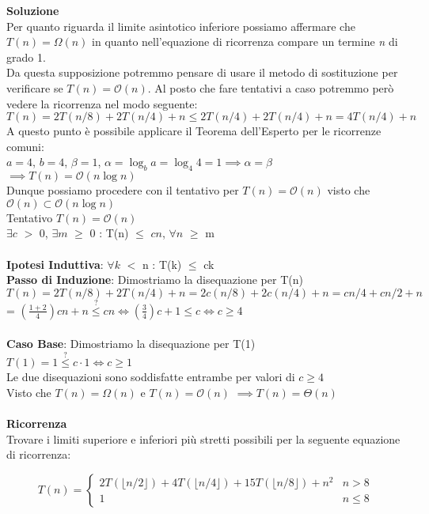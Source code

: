 \documentclass[../cheatSheetAlgoritmi.tex]{subfiles}
\begin{document}
\textbf{Soluzione}\\
Per quanto riguarda il limite asintotico inferiore possiamo affermare che $T(n) = \Omega(n)$ in quanto nell'equazione di ricorrenza compare un termine \textit{n} di grado 1.\\
Da questa supposizione potremmo pensare di usare il metodo di sostituzione per verificare se $T(n) = \mathcal{O}(n)$. Al posto che fare tentativi a caso potremmo però vedere la ricorrenza nel modo seguente:\\
$T(n) = 2T(n/8) + 2T(n/4) + n \leq 2T(n/4) + 2T(n/4) + n = 4T(n/4) + n$\\
A questo punto è possibile applicare il Teorema dell'Esperto per le ricorrenze comuni:\\
$a = 4$, $b = 4$, $\beta = 1$, $\alpha = \log_{b}{a} = \log_{4}{4} = 1 \implies \alpha = \beta$\\
$\implies T(n) = \mathcal{O}(n\log{n})$\\
Dunque possiamo procedere con il tentativo per $T(n) = \mathcal{O}(n)$ visto che $\mathcal{O}(n) \subset \mathcal{O}(n\log{n})$\\
Tentativo $T(n) = \mathcal{O}(n)$\\
$\exists c$ $>$ 0, $\exists m$ $\geq$ 0 : T(n) $\leq$ $cn$, $\forall n$ $\geq$ m\\\\
\textbf{Ipotesi Induttiva}: $\forall k$ $<$ n : T(k) $\leq$ ck\\
\textbf{Passo di Induzione}: Dimostriamo la disequazione per T(n)\\
$T(n) = 2T(n/8) + 2T(n/4) + n = 2c(n/8) + 2c(n/4) + n = cn/4 + cn/2 + n$\\
= $(\frac{1 + 2}{4})cn + n \stackrel{?}{\leq} cn \iff (\frac{3}{4})c + 1 \leq c \iff c \geq 4$\\\\
\textbf{Caso Base}: Dimostriamo la disequazione per T(1)\\
$T(1) = 1 \stackrel{?}{\leq} c \cdot 1 \iff c \geq 1$\\
Le due disequazioni sono soddisfatte entrambe per valori di $c \geq 4$\\
Visto che $T(n) = \Omega(n)$ e $T(n) = \mathcal{O}(n)$ $\implies T(n) = \Theta(n)$\\\\
\textbf{Ricorrenza}\\
Trovare i limiti superiore e inferiori più stretti possibili per la seguente equazione di ricorrenza:
\begin{center}
	\begin{equation*}
  		T(n)=\begin{cases}
			2T(\lfloor n/2 \rfloor) + 4T(\lfloor n/4 \rfloor) + 15T(\lfloor n/8 \rfloor) + n^{2} & \text{$n > 8$}\\
			1 & \text{$n \leq 8$}	
  	\end{cases}
	\end{equation*}
\end{center}
\end{document}
